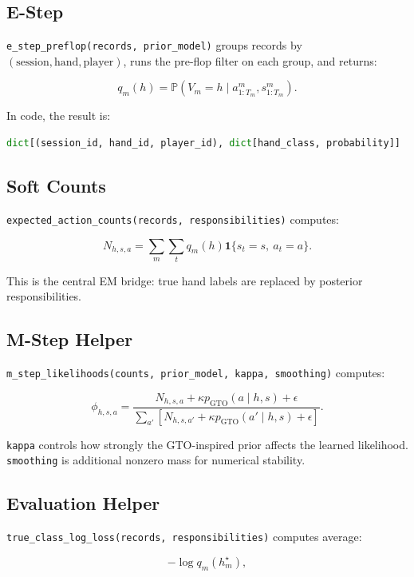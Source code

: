 \documentclass[11pt]{article}
\newcommand{\Prb}{\mathbb{P}}
\begin{document}
\subsection{E-Step}

\texttt{e\_step\_preflop(records, prior\_model)} groups records by
\((\text{session}, \text{hand}, \text{player})\), runs the pre-flop filter on
each group, and returns:

\[
q_m(h)
=
\Prb(V_m=h \mid a^m_{1:T_m},s^m_{1:T_m}).
\]

In code, the result is:

\begin{lstlisting}[language=Python]
dict[(session_id, hand_id, player_id), dict[hand_class, probability]]
\end{lstlisting}

\subsection{Soft Counts}

\texttt{expected\_action\_counts(records, responsibilities)} computes:

\[
N_{h,s,a}
=
\sum_m
\sum_t
q_m(h)\mathbf{1}\{s_t=s,\ a_t=a\}.
\]

This is the central EM bridge: true hand labels are replaced by posterior
responsibilities.

\subsection{M-Step Helper}

\texttt{m\_step\_likelihoods(counts, prior\_model, kappa, smoothing)} computes:

\[
\phi_{h,s,a}
=
\frac{
N_{h,s,a}
+ \kappa p_{\mathrm{GTO}}(a\mid h,s)
+ \epsilon
}{
\sum_{a'}
\left[
N_{h,s,a'}
+ \kappa p_{\mathrm{GTO}}(a'\mid h,s)
+ \epsilon
\right]
}.
\]

\texttt{kappa} controls how strongly the GTO-inspired prior affects the learned
likelihood. \texttt{smoothing} is additional nonzero mass for numerical
stability.

\subsection{Evaluation Helper}

\texttt{true\_class\_log\_loss(records, responsibilities)} computes average:

\[
-\log q_m(h_m^\star),
\]
\end{document}

